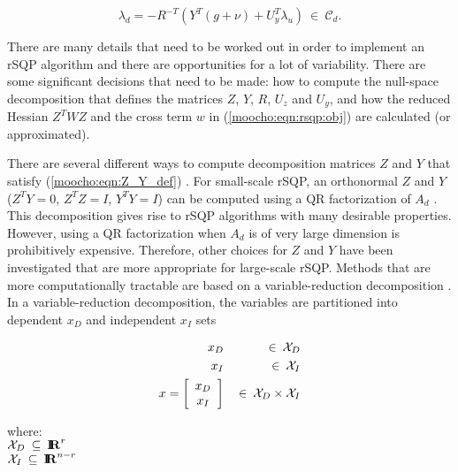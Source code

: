\documentclass[pdf,ps2pdf,11pt]{SANDreport}
\begin{document}
{{\bsinglespace
\begin{equation}
\lambda_d = - R^{-T} \left( Y^T(g + \nu) + U_y^T \lambda_u \right)
    \:\in\:\mathcal{C}_d.
\label{moocho:eqn:lambda_d}
\end{equation}
\esinglespace}

There are many details that need to be worked out in order to
implement an rSQP algorithm and there are opportunities for a lot of
variability.  There are some significant decisions that need to be
made: how to compute the null-space decomposition that defines the
matrices $Z$, $Y$, $R$, $U_z$ and $U_y$, and how the reduced Hessian
$Z^T W Z$ and the cross term $w$ in (\ref{moocho:eqn:rsqp:obj}) are
calculated (or approximated).

There are several different ways to compute decomposition matrices $Z$
and $Y$ that satisfy (\ref{moocho:eqn:Z_Y_def})
\cite{ref:schmid_accel_1993}.  For small-scale rSQP, an orthonormal
$Z$ and $Y$ ($Z^T Y = 0$, $Z^T Z = I$, $Y^T Y = I$) can be computed
using a QR factorization of $A_d$ \cite{ref:nocedal_overton_1985}.
This decomposition gives rise to rSQP algorithms with many desirable
properties.  However, using a QR factorization when $A_d$ is of very
large dimension is prohibitively expensive.  Therefore, other choices
for $Z$ and $Y$ have been investigated that are more appropriate for
large-scale rSQP.  Methods that are more computationally tractable are
based on a variable-reduction decomposition
\cite{ref:schmid_accel_1993}.  In a variable-reduction decomposition,
the variables are partitioned into dependent $x_D$ and independent
$x_I$ sets

{\bsinglespace
\begin{eqnarray}
x_D & & \:\in\:\mathcal{X}_D \\
x_I & & \:\in\:\mathcal{X}_I \\
x = {\bmat{c} x_D \\ x_I \emat} & & \:\in\: \mathcal{X}_D \times \mathcal{X}_I
\label{rsqp:eqn:x_D_I} \\
\end{eqnarray}
\begin{tabbing}
\hspace{4ex}where:\hspace{5ex}\= \\
\>	$\mathcal{X}_D\:\subseteq\:\RE^{r}$\\
\>	$\mathcal{X}_I\:\subseteq\:\RE^{n-r}$
\end{tabbing}
\esinglespace}

}
\end{document}
